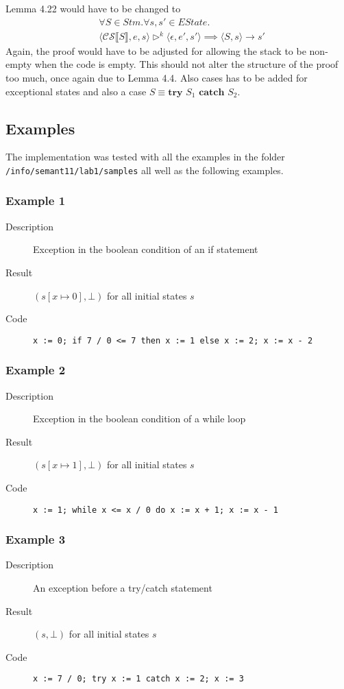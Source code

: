 \documentclass[11pt,oneside,a4paper]{article}
\newcommand{\SExp}[2]{\mathcal{#1}\llbracket #2 \rrbracket}
\newcommand{\AMConf}[3]{\langle #1, #2, #3 \rangle}
\newcommand{\NSConf}[2]{\langle #1, #2 \rangle}
\newcommand{\NSProd}[3]{\NSConf{#1}{#2} \rightarrow #3}
\begin{document}
Lemma 4.22 would have to be changed to
\begin{align*}
&\forall S \in Stm.\forall s, s' \in EState. \\
&\AMConf{\SExp{CS}{S}}{e}{s} \triangleright^k \AMConf{\epsilon}{e'}{s'} \implies
\NSProd{S}{s}{s'}
\end{align*}
Again, the proof would have to be adjusted for allowing the stack to be
non-empty when the code is empty. This should not alter the structure of the
proof too much, once again due to Lemma 4.4. Also cases has to be added 
for exceptional states and also a case \(S \equiv \textbf{try } S_1 \textbf{ catch }
S_2\).


\subsection*{Examples}
The implementation was tested with all the examples in the folder 
\texttt{/info/semant11/lab1/samples} all well as the following examples.
\subsubsection*{Example 1}
\begin{description}
\item[Description] Exception in the boolean condition of an if statement 
\item[Result] \((s[x \mapsto 0], \bot)\) for all initial states \(s\)
\item[Code]
\begin{verbatim}
x := 0; if 7 / 0 <= 7 then x := 1 else x := 2; x := x - 2 
\end{verbatim}
\end{description}

\subsubsection*{Example 2}
\begin{description}
\item[Description] Exception in the boolean condition of a while loop
\item[Result] \((s[x \mapsto 1], \bot)\) for all initial states \(s\)
\item[Code]
\begin{verbatim}
x := 1; while x <= x / 0 do x := x + 1; x := x - 1
\end{verbatim}
\end{description}

\subsubsection*{Example 3}
\begin{description}
\item[Description] An exception before a try/catch statement
\item[Result] \((s, \bot)\) for all initial states \(s\)
\item[Code]
\begin{verbatim}
x := 7 / 0; try x := 1 catch x := 2; x := 3
\end{verbatim}
\end{description}
\end{document}
